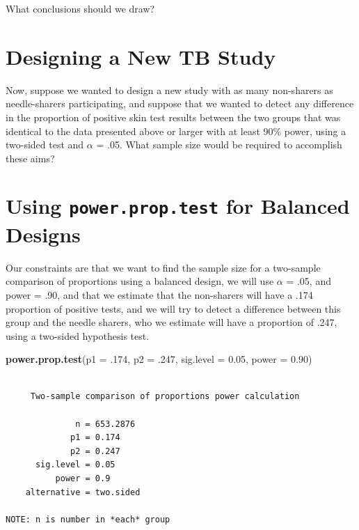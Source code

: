 \documentclass[
]{book}
\newenvironment{Shaded}{\begin{snugshade}}{\end{snugshade}}
\newcommand{\DataTypeTok}[1]{\textcolor[rgb]{0.13,0.29,0.53}{#1}}
\newcommand{\FloatTok}[1]{\textcolor[rgb]{0.00,0.00,0.81}{#1}}
\newcommand{\KeywordTok}[1]{\textcolor[rgb]{0.13,0.29,0.53}{\textbf{#1}}}
\newcommand{\NormalTok}[1]{#1}
\begin{document}
What conclusions should we draw?

\hypertarget{designing-a-new-tb-study}{%
\section{Designing a New TB Study}\label{designing-a-new-tb-study}}

Now, suppose we wanted to design a new study with as many non-sharers as needle-sharers participating, and suppose that we wanted to detect any difference in the proportion of positive skin test results between the two groups that was identical to the data presented above or larger with at least 90\% power, using a two-sided test and \(\alpha\) = .05. What sample size would be required to accomplish these aims?

\hypertarget{using-power.prop.test-for-balanced-designs}{%
\section{\texorpdfstring{Using \texttt{power.prop.test} for Balanced Designs}{Using power.prop.test for Balanced Designs}}\label{using-power.prop.test-for-balanced-designs}}

Our constraints are that we want to find the sample size for a two-sample comparison of proportions using a balanced design, we will use \(\alpha\) = .05, and power = .90, and that we estimate that the non-sharers will have a .174 proportion of positive tests, and we will try to detect a difference between this group and the needle sharers, who we estimate will have a proportion of .247, using a two-sided hypothesis test.

\begin{Shaded}
\begin{Highlighting}[]
\KeywordTok{power.prop.test}\NormalTok{(}\DataTypeTok{p1 =} \FloatTok{.174}\NormalTok{, }\DataTypeTok{p2  =} \FloatTok{.247}\NormalTok{, }\DataTypeTok{sig.level =} \FloatTok{0.05}\NormalTok{, }\DataTypeTok{power =} \FloatTok{0.90}\NormalTok{)}
\end{Highlighting}
\end{Shaded}

\begin{verbatim}

     Two-sample comparison of proportions power calculation 

              n = 653.2876
             p1 = 0.174
             p2 = 0.247
      sig.level = 0.05
          power = 0.9
    alternative = two.sided

NOTE: n is number in *each* group
\end{verbatim}
\end{document}
